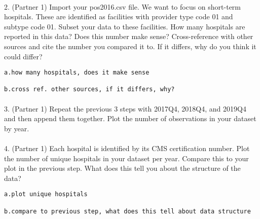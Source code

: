 \documentclass[
  letterpaper,
  DIV=11,
  numbers=noendperiod]{scrartcl}
\makeatletter
\let\oldparagraph\paragraph
\renewcommand{\paragraph}{
    \@ifstar
      \xxxParagraphStar
      \xxxParagraphNoStar
  }
\newcommand{\xxxParagraphStar}[1]{\oldparagraph*{#1}\mbox{}}
\newcommand{\xxxParagraphNoStar}[1]{\oldparagraph{#1}\mbox{}}
\makeatother
\begin{document}
\paragraph{2. (Partner 1) Import your pos2016.csv file. We want to focus
on short-term hospitals. These are identified as facilities with
provider type code 01 and subtype code 01. Subset your data to these
facilities. How many hospitals are reported in this data? Does this
number make sense? Cross-reference with other sources and cite the
number you compared it to. If it differs, why do you think it could
differ?}\label{partner-1-import-your-pos2016.csv-file.-we-want-to-focus-on-short-term-hospitals.-these-are-identified-as-facilities-with-provider-type-code-01-and-subtype-code-01.-subset-your-data-to-these-facilities.-how-many-hospitals-are-reported-in-this-data-does-this-number-make-sense-cross-reference-with-other-sources-and-cite-the-number-you-compared-it-to.-if-it-differs-why-do-you-think-it-could-differ}

\begin{verbatim}
a.how many hospitals, does it make sense

b.cross ref. other sources, if it differs, why?
\end{verbatim}

\paragraph{3. (Partner 1) Repeat the previous 3 steps with 2017Q4,
2018Q4, and 2019Q4 and then append them together. Plot the number of
observations in your dataset by
year.}\label{partner-1-repeat-the-previous-3-steps-with-2017q4-2018q4-and-2019q4-and-then-append-them-together.-plot-the-number-of-observations-in-your-dataset-by-year.}

\paragraph{4. (Partner 1) Each hospital is identified by its CMS
certification number. Plot the number of unique hospitals in your
dataset per year. Compare this to your plot in the previous step. What
does this tell you about the structure of the
data?}\label{partner-1-each-hospital-is-identified-by-its-cms-certification-number.-plot-the-number-of-unique-hospitals-in-your-dataset-per-year.-compare-this-to-your-plot-in-the-previous-step.-what-does-this-tell-you-about-the-structure-of-the-data}

\begin{verbatim}
a.plot unique hospitals

b.compare to previous step, what does this tell about data structure
\end{verbatim}
\end{document}
